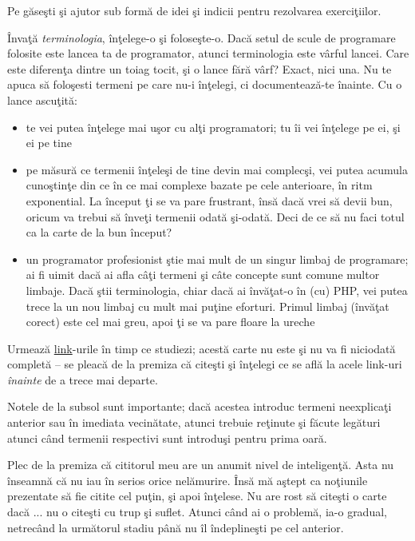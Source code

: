 Pe {\phpro} găseşti şi ajutor sub formă de idei şi indicii pentru rezolvarea
exerciţiilor.

Învaţă \textit{terminologia}, înţelege-o şi foloseşte-o. Dacă setul de scule de programare folosite
este lancea ta de programator, atunci terminologia este vârful lancei.
Care este diferenţa dintre un toiag tocit, şi o lance fără vârf?
Exact, nici una. Nu te apuca să foloşesti termeni pe care nu-i înţelegi,
ci documentează-te înainte. Cu o lance ascuţită:
\begin{itemize}
	\item te vei putea înţelege mai uşor cu alţi programatori; tu îi vei înţelege pe ei, şi ei pe tine
	\item pe măsură ce termenii înţeleşi de tine devin mai complecşi,
		  vei putea acumula cunoştinţe din ce în ce mai complexe bazate pe cele anterioare,
		  în ritm exponential. La început ţi se va pare frustrant, însă dacă vrei să devii bun,
		  oricum va trebui să înveţi termenii odată şi-odată. Deci de ce să nu faci totul ca
		  la carte de la bun început?
	\item un programator profesionist ştie mai mult de un singur limbaj de programare; ai fi
		  uimit dacă ai afla câţi termeni şi câte concepte sunt comune multor limbaje. Dacă
		  ştii terminologia, chiar dacă ai învăţat-o în (cu) PHP, vei putea trece la un nou
		  limbaj cu mult mai puţine eforturi. Primul limbaj (învăţat corect) este cel mai greu,
		  apoi ţi se va pare floare la ureche
\end{itemize}


Urmează \href{http://en.wikipedia.org/wiki/Hyperlink}{link}-urile în timp ce
studiezi;
acestă carte nu este şi nu va fi niciodată {\glqq}completă{\grqq} -- se pleacă de la premiza
că citeşti şi înţelegi ce se află la acele link-uri \textit{înainte} de a trece
mai departe.

Notele de la subsol sunt importante; dacă acestea introduc termeni neexplicaţi
anterior sau în imediata vecinătate, atunci trebuie reţinute şi făcute
legături atunci când termenii respectivi sunt introduşi pentru prima oară.

Plec de la premiza că cititorul meu are un anumit nivel de inteligenţă.
Asta nu înseamnă că nu iau în serios orice nelămurire. Însă mă aştept
ca noţiunile prezentate să fie citite cel puţin, şi apoi înţelese.
Nu are rost să citeşti o carte dacă ... nu o citeşti cu trup şi suflet.
Atunci când ai o problemă, ia-o gradual, netrecând la următorul stadiu
până nu îl îndeplineşti pe cel anterior.

